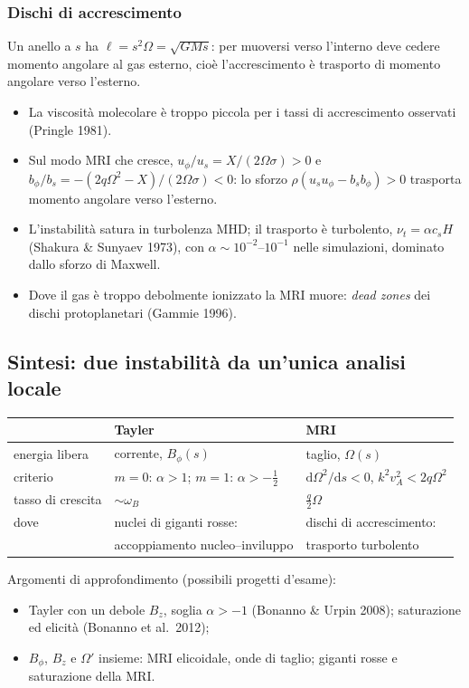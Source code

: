 \subsubsection{Dischi di accrescimento}
Un anello a $s$ ha $\ell=s^2\Omega=\sqrt{GMs}$: per muoversi verso l'interno deve cedere momento angolare al gas esterno, cioè l'accrescimento è trasporto di momento angolare verso l'esterno.
\begin{itemize}
\item La viscosità molecolare è troppo piccola per i tassi di accrescimento osservati (Pringle 1981).
\item Sul modo MRI che cresce, $u_\phi/u_s=X/(2\Omega\sigma)>0$ e $b_\phi/b_s=-(2q\Omega^2-X)/(2\Omega\sigma)<0$: lo sforzo $\rho(u_su_\phi-b_sb_\phi)>0$ trasporta momento angolare verso l'esterno.
\item L'instabilità satura in turbolenza MHD; il trasporto è turbolento, $\nu_t=\alpha c_sH$ (Shakura \& Sunyaev 1973), con $\alpha\sim10^{-2}$--$10^{-1}$ nelle simulazioni, dominato dallo sforzo di Maxwell.
\item Dove il gas è troppo debolmente ionizzato la MRI muore: \emph{dead zones} dei dischi protoplanetari (Gammie 1996).
\end{itemize}

\subsection{Sintesi: due instabilità da un'unica analisi locale}

\begin{center}
\begin{tabular}{lll}
\hline
 & Tayler & MRI\\
\hline
energia libera & corrente, $B_\phi(s)$ & taglio, $\Omega(s)$\\
criterio & $m=0$: $\alpha>1$; $m=1$: $\alpha>-\tfrac12$ & $\mathrm{d}\Omega^2/\mathrm{d}s<0$, $k^2v_A^2<2q\Omega^2$\\
tasso di crescita & $\sim\omega_B$ & $\tfrac q2\Omega$\\
dove & nuclei di giganti rosse: & dischi di accrescimento:\\
 & accoppiamento nucleo--inviluppo & trasporto turbolento\\
\hline
\end{tabular}
\end{center}

Argomenti di approfondimento (possibili progetti d'esame):
\begin{itemize}
\item Tayler con un debole $B_z$, soglia $\alpha>-1$ (Bonanno \& Urpin 2008); saturazione ed elicità (Bonanno et al.\ 2012);
\item $B_\phi$, $B_z$ e $\Omega'$ insieme: MRI elicoidale, onde di taglio; giganti rosse e saturazione della MRI.
\end{itemize}

